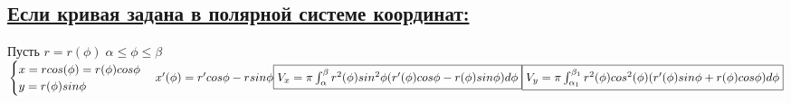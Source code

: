 \documentclass[12pt]{article}
\begin{document}
    \subsection*{\underline{Если кривая задана в полярной системе координат:}}
    Пусть $r=r(\phi) \; \alpha \leq \phi \leq \beta$\\
    \begin{math}
        \begin{cases}
            x=rcos(\phi)=r(\phi)cos\phi\\
            y=r(\phi)sin\phi
        \end{cases}\\
        x'(\phi)=r'cos\phi-rsin\phi\\
        \fbox{$V_x=\pi \int_{\alpha}^{\beta} r^2(\phi)sin^2\phi (r'(\phi)cos \phi -r(\phi)sin\phi)d\phi$}\\
        \fbox{$V_y=\pi \int_{\alpha_1}^{\beta_1}r^2(\phi)cos^2(\phi)(r'(\phi)sin\phi + r(\phi)cos\phi)d\phi$}
    \end{math}
\end{document}
